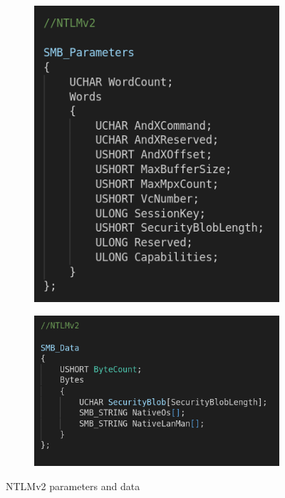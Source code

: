\begin{figure}[h]
    
  \begin{subfigure}{0.5\textwidth}
    \begin{center}
      \includegraphics[scale=0.35]{images/ntlmv2_params.png}
    \end{center}
  \end{subfigure}
  \begin{subfigure}{0.5\textwidth}
    \begin{center}
      \includegraphics[scale=0.35]{images/ntlmv2_data.png}
    \end{center}
  \end{subfigure}
  \caption{NTLMv2 parameters and data}
\end{figure}

